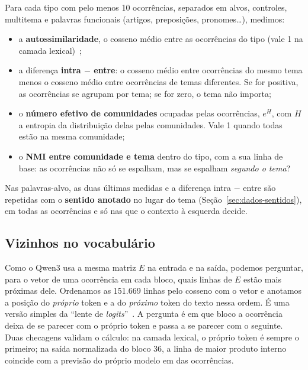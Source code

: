 Para cada tipo com pelo menos 10 ocorrências, separados em alvos, controles, multitema e
palavras funcionais (artigos, preposições, pronomes\ldots), medimos:
\begin{itemize}
    \item a \textbf{autossimilaridade}, o cosseno médio entre as ocorrências do tipo (vale 1 na
    camada lexical)~\cite{ethayarajh2019};
    \item a diferença \textbf{intra $-$ entre}: o cosseno médio entre ocorrências do mesmo tema
    menos o cosseno médio entre ocorrências de temas diferentes. Se for positiva, as
    ocorrências se agrupam por tema; se for zero, o tema não importa;
    \item o \textbf{número efetivo de comunidades} ocupadas pelas ocorrências, $e^{H}$, com $H$
    a entropia da distribuição delas pelas comunidades. Vale 1 quando todas estão na mesma
    comunidade;
    \item o \textbf{NMI entre comunidade e tema} dentro do tipo, com a sua linha de base: as
    ocorrências não só se espalham, mas se espalham \emph{segundo o tema}?
\end{itemize}
Nas palavras-alvo, as duas últimas medidas e a diferença intra $-$ entre são repetidas com o
\textbf{sentido anotado} no lugar do tema (Seção~\ref{sec:dados-sentidos}), em todas as
ocorrências e só nas que o contexto à esquerda decide.

\subsection{Vizinhos no vocabulário}\label{sec:met-lente}

Como o Qwen3 usa a mesma matriz $E$ na entrada e na saída, podemos perguntar, para o vetor de
uma ocorrência em cada bloco, quais linhas de $E$ estão mais próximas dele. Ordenamos as
151.669 linhas pelo cosseno com o vetor e anotamos a posição do \emph{próprio} token e a do
\emph{próximo} token do texto nessa ordem. É uma versão simples da ``lente de
\emph{logits}''~\cite{nostalgebraist2020}. A pergunta é em que bloco a ocorrência deixa de se
parecer com o próprio token e passa a se parecer com o seguinte. Duas checagens validam o
cálculo: na camada lexical, o próprio token é sempre o primeiro; na saída normalizada do bloco
36, a linha de maior produto interno coincide com a previsão do próprio modelo em
\concordanciaPredicao{} das ocorrências.
